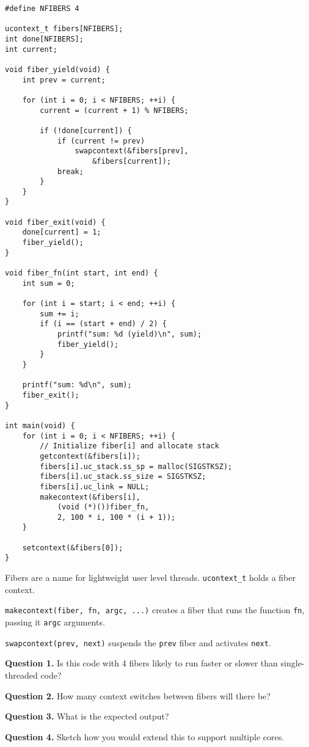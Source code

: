\documentclass[letterpaper,twocolumn,10pt]{article}
\begin{document}
\begin{lstlisting}[style=CStyle]
#define NFIBERS 4

ucontext_t fibers[NFIBERS];
int done[NFIBERS];
int current;

void fiber_yield(void) {
    int prev = current;

    for (int i = 0; i < NFIBERS; ++i) {
        current = (current + 1) % NFIBERS;

        if (!done[current]) {
            if (current != prev)
                swapcontext(&fibers[prev],
                    &fibers[current]);
            break;
        }
    }
}

void fiber_exit(void) {
    done[current] = 1;
    fiber_yield();
}

void fiber_fn(int start, int end) {
    int sum = 0;

    for (int i = start; i < end; ++i) {
        sum += i;
        if (i == (start + end) / 2) {
            printf("sum: %d (yield)\n", sum);
            fiber_yield();
        }
    }

    printf("sum: %d\n", sum);
    fiber_exit();
}

int main(void) {
    for (int i = 0; i < NFIBERS; ++i) {
        // Initialize fiber[i] and allocate stack
        getcontext(&fibers[i]);
        fibers[i].uc_stack.ss_sp = malloc(SIGSTKSZ);
        fibers[i].uc_stack.ss_size = SIGSTKSZ;
        fibers[i].uc_link = NULL;
        makecontext(&fibers[i],
            (void (*)())fiber_fn,
            2, 100 * i, 100 * (i + 1));
    }

    setcontext(&fibers[0]);
}
\end{lstlisting}

\break

\noindent

Fibers are a name for lightweight user level threads.
\texttt{ucontext\_t} holds a fiber context.

\vspace{1em}

\texttt{makecontext(fiber, fn, argc, ...)} creates a fiber that runs the function \texttt{fn}, passing it \texttt{argc} arguments.

\vspace{1em}

\texttt{swapcontext(prev, next)} suspends the \texttt{prev} fiber and activates \texttt{next}.

\vspace{2em}

\textbf{Question 1.} Is this code with 4 fibers likely to run faster or slower than single-threaded code?

\vspace{12em}

\noindent
\textbf{Question 2.} How many context switches between fibers will there be?

\vspace{12em}
\noindent
\textbf{Question 3.} What is the expected output?

\vspace{12em}
\noindent
\textbf{Question 4.} Sketch how you would extend this to support 
multiple cores.
\end{document}
